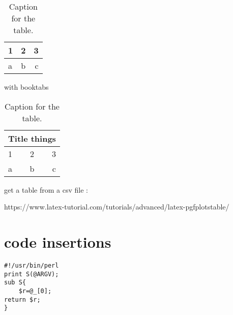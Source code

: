 \documentclass{article}
\begin{document}
\begin{table}[h!]
  \centering
  \caption{Caption for the table.}
  \label{tab:table1}
  \begin{tabular}{l|c||r} %
    1 & 2 & 3\\
    \hline
    a & b & c\\
  \end{tabular}
\end{table}

with booktabs

\begin{table}[h!]
  \centering
  \caption{Caption for the table.}
  \label{tab:table1:extended}
  \begin{tabular}{l|c||r} %
  \toprule
  	\multicolumn{3}{c}{Title things} \\ %
  \midrule
    1 & 2 & 3\\
    \hline
    a & b & c\\
  \bottomrule  
  \end{tabular}
\end{table}


get a table from a csv file :

https://www.latex-tutorial.com/tutorials/advanced/latex-pgfplotstable/


\section{code insertions}


\begin{lstlisting}
#!/usr/bin/perl
print S(@ARGV);
sub S{
	$r=@_[0];
return $r;
}
\end{lstlisting}

%


 \begin{appendix}
  \listoffigures
  \listoftables
 \end{appendix}

\end{document}
